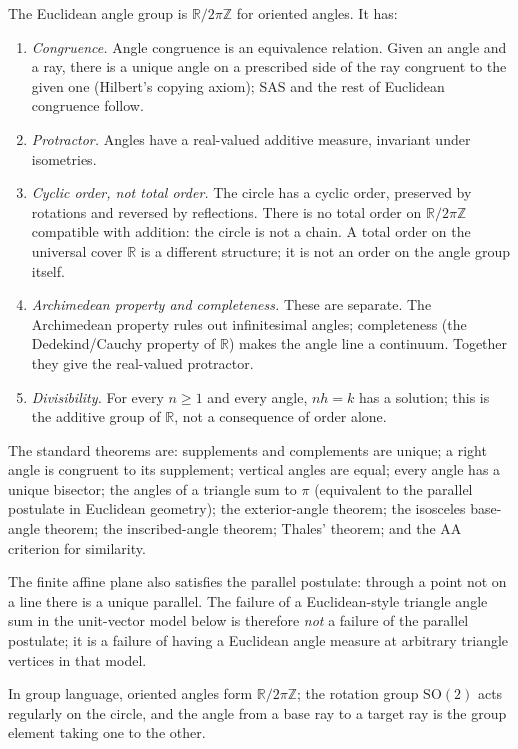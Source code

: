 \documentclass[11pt]{article}
\theoremstyle{definition}
\theoremstyle{remark}
\newcommand{\Z}{\mathbb{Z}}
\newcommand{\R}{\mathbb{R}}
\begin{document}
The Euclidean angle group is $\R/2\pi\Z$ for oriented angles.  It has:
\begin{enumerate}
\item \emph{Congruence.}  Angle congruence is an equivalence relation.  Given an
angle and a ray, there is a unique angle on a prescribed side of the ray
congruent to the given one (Hilbert's copying axiom); SAS and the rest of
Euclidean congruence follow.
\item \emph{Protractor.}  Angles have a real-valued additive measure,
invariant under isometries.
\item \emph{Cyclic order, not total order.}  The circle has a cyclic order,
preserved by rotations and reversed by reflections.  There is no total order on
$\R/2\pi\Z$ compatible with addition: the circle is not a chain.  A total order
on the universal cover $\R$ is a different structure; it is not an order on the
angle group itself.
\item \emph{Archimedean property and completeness.}  These are separate.  The
Archimedean property rules out infinitesimal angles; completeness (the
Dedekind/Cauchy property of $\R$) makes the angle line a continuum.  Together
they give the real-valued protractor.
\item \emph{Divisibility.}  For every $n\ge1$ and every angle, $nh=k$ has a
solution; this is the additive group of $\R$, not a consequence of order alone.
\end{enumerate}

The standard theorems are: supplements and complements are unique; a right
angle is congruent to its supplement; vertical angles are equal; every angle has
a unique bisector; the angles of a triangle sum to $\pi$ (equivalent to the
parallel postulate in Euclidean geometry); the exterior-angle theorem; the
isosceles base-angle theorem; the inscribed-angle theorem; Thales' theorem; and
the AA criterion for similarity.

The finite affine plane also satisfies the parallel postulate: through a point
not on a line there is a unique parallel.  The failure of a Euclidean-style
triangle angle sum in the unit-vector model below is therefore \emph{not} a
failure of the parallel postulate; it is a failure of having a Euclidean angle
measure at arbitrary triangle vertices in that model.

In group language, oriented angles form $\R/2\pi\Z$; the rotation group
$\mathrm{SO}(2)$ acts regularly on the circle, and the angle from a base ray to
a target ray is the group element taking one to the other.
\end{document}

